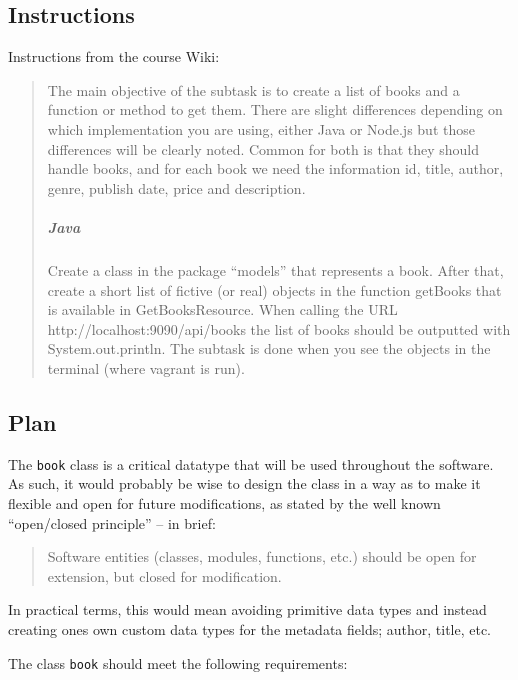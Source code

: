 \subsection{Instructions}\label{task-1a-instructions}
Instructions from the course Wiki\cite{1dv600:lab1:instructions}:

\begin{quote}
  The main objective of the subtask is to create a list of books and a function
  or method to get them. There are slight differences depending on which
  implementation you are using, either Java or Node.js but those differences
  will be clearly noted. Common for both is that they should handle books,
  and for each book we need the information id, title, author, genre, publish
  date, price and description.

  \subparagraph{Java}
  Create a class in the package ``models'' that represents a book. After
  that, create a short list of fictive (or real) objects in the function
  getBooks that is available in GetBooksResource. When calling the URL
  http://localhost:9090/api/books the list of books should be outputted
  with System.out.println. The subtask is done when you see the objects in
  the terminal (where vagrant is run).
\end{quote}


\subsection{Plan}\label{task-1a-plan}
The \texttt{book} class is a critical datatype that will be used throughout the
software. As such, it would probably be wise to design the class in a way as to
make it flexible and open for future modifications, as stated by the well known
``open/closed principle''\cite{Martin:1996:OPS} -- in brief\cite{SOLID:OCP:Meyer}:

\begin{quote}
  Software entities (classes, modules, functions, etc.) should be open for
  extension, but closed for modification.
\end{quote}

In practical terms, this would mean avoiding primitive data types and instead
creating ones own custom data types for the metadata fields; author, title,
etc.


The class \texttt{book} should meet the following requirements:

